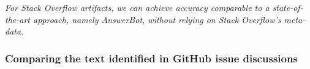 \medskip
\begin{bluequote}
    \textit{For Stack Overflow artifacts, we can achieve accuracy comparable  
    to a state-of-the-art approach, namely AnswerBot, without relying on Stack Overflow's meta-data.}
\end{bluequote}





\subsubsection{Comparing the text identified in GitHub issue discussions}




























